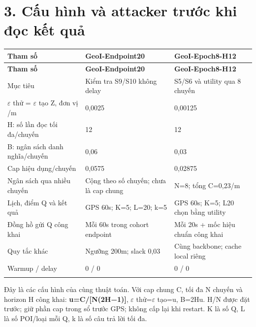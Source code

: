 \documentclass[11pt,a4paper]{article}
\begin{document}
\section*{3. Cấu hình và attacker trước khi đọc kết quả}
\begingroup\small
\begin{longtable}{@{}P{4.661cm}P{6.080cm}P{6.080cm}@{}}
\toprule
\textbf{Tham số} & \textbf{GeoI-Endpoint20} & \textbf{GeoI-Epoch8-H12}\\\midrule
\endfirsthead
\toprule
\textbf{Tham số} & \textbf{GeoI-Endpoint20} & \textbf{GeoI-Epoch8-H12}\\\midrule
\endhead\bottomrule\endfoot
Mục tiêu & Kiểm tra S9/S10 không delay & S5/S6 và utility qua 8 chuyến\\
\addlinespace[2pt]
$\varepsilon$ thử = $\varepsilon$ tạo Z, đơn vị /m & 0,0025 & 0,00125\\
\addlinespace[2pt]
H: số lần đọc tối đa/chuyến & 12 & 12\\
\addlinespace[2pt]
B: ngân sách danh nghĩa/chuyến & 0,06 & 0,03\\
\addlinespace[2pt]
Cap hiệu dụng/chuyến & 0,0575 & 0,02875\\
\addlinespace[2pt]
Ngân sách qua nhiều chuyến & Cộng theo số chuyến; chưa là cap chung & N=8; tổng C=0,23/m\\
\addlinespace[2pt]
Lịch, điểm Q và kết quả & GPS 60s; K=5; L=20; k=5 & GPS 60s; K=5; L20 chọn bằng utility\\
\addlinespace[2pt]
Đồng hồ gửi Q công khai & Mỗi 60s trong cohort endpoint & Mỗi 20s + mốc hiệu chuẩn công khai\\
\addlinespace[2pt]
Quy tắc khác & Ngưỡng 200m; slack 0,03 & Cùng backbone; cache local riêng\\
\addlinespace[2pt]
Warmup / delay & 0 / 0 & 0 / 0\\
\addlinespace[2pt]
\end{longtable}
\endgroup
Đây là các cấu hình của cùng thuật toán. Với cap chung C, tối đa N chuyến và horizon H công khai: \textbf{u=C/[N(2H−1)]}, $\varepsilon$ thử=$\varepsilon$ tạo=u, B=2Hu. H/N được đặt trước; giữ phần cap trong sổ trước GPS; không cấp lại khi restart. K là số Q, L là số POI/loại mỗi Q, k là số câu trả lời tối đa.
\end{document}
